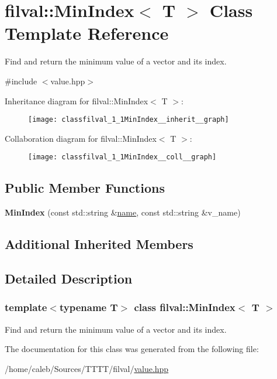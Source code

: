 \hypertarget{classfilval_1_1MinIndex}{}\section{filval\+:\+:Min\+Index$<$ T $>$ Class Template Reference}
\label{classfilval_1_1MinIndex}


Find and return the minimum value of a vector and its index.  




{\ttfamily \#include $<$value.\+hpp$>$}



Inheritance diagram for filval\+:\+:Min\+Index$<$ T $>$\+:
\nopagebreak
\begin{figure}[H]
\begin{center}
\leavevmode
\texttt{[image: classfilval\_1\_1MinIndex\_\_inherit\_\_graph]}
\end{center}
\end{figure}


Collaboration diagram for filval\+:\+:Min\+Index$<$ T $>$\+:
\nopagebreak
\begin{figure}[H]
\begin{center}
\leavevmode
\texttt{[image: classfilval\_1\_1MinIndex\_\_coll\_\_graph]}
\end{center}
\end{figure}
\subsection*{Public Member Functions}
\begin{DoxyCompactItemize}
\item 
\hypertarget{classfilval_1_1MinIndex_ae21f26c7441580054990750352a53cd1}{}\label{classfilval_1_1MinIndex_ae21f26c7441580054990750352a53cd1} 
{\bfseries Min\+Index} (const std\+::string \&\hyperlink{classfilval_1_1GenValue_a007e38c03ee041c2a657afa3d6e91ab1}{name}, const std\+::string \&v\+\_\+name)
\end{DoxyCompactItemize}
\subsection*{Additional Inherited Members}


\subsection{Detailed Description}
\subsubsection*{template$<$typename T$>$\newline
class filval\+::\+Min\+Index$<$ T $>$}

Find and return the minimum value of a vector and its index. 

The documentation for this class was generated from the following file\+:\begin{DoxyCompactItemize}
\item 
/home/caleb/\+Sources/\+T\+T\+T\+T/filval/\hyperlink{value_8hpp}{value.\+hpp}\end{DoxyCompactItemize}
